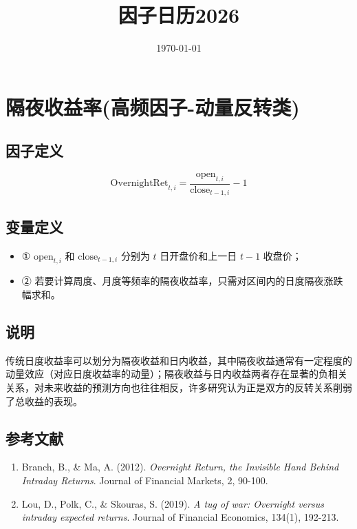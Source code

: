 \documentclass{article}
\title{因子日历2026}
\date{\today}
\begin{document}
\maketitle

\section{隔夜收益率(高频因子-动量反转类)}

\subsection{因子定义}
\begin{equation}
    \mathrm{OvernightRet}_{t,i} = \frac{\mathrm{open}_{t,i}}{\mathrm{close}_{t-1,i}} - 1
\end{equation}

\subsection{变量定义}
\begin{itemize}
    \item ① \( \mathrm{open}_{t,i} \) 和 \( \mathrm{close}_{t-1,i} \) 分别为 \( t \) 日开盘价和上一日 \( t-1 \) 收盘价；
    \item ② 若要计算周度、月度等频率的隔夜收益率，只需对区间内的日度隔夜涨跌幅求和。
\end{itemize}

\subsection{说明}
传统日度收益率可以划分为隔夜收益和日内收益，其中隔夜收益通常有一定程度的动量效应（对应日度收益率的动量）；隔夜收益与日内收益两者存在显著的负相关关系，对未来收益的预测方向也往往相反，许多研究认为正是双方的反转关系削弱了总收益的表现。

\subsection{参考文献}
\begin{enumerate}
    \item Branch, B., \& Ma, A. (2012). \textit{Overnight Return, the Invisible Hand Behind Intraday Returns}. Journal of Financial Markets, 2, 90-100.
    \item Lou, D., Polk, C., \& Skouras, S. (2019). \textit{A tug of war: Overnight versus intraday expected returns}. Journal of Financial Economics, 134(1), 192-213.
\end{enumerate}
\end{document}
